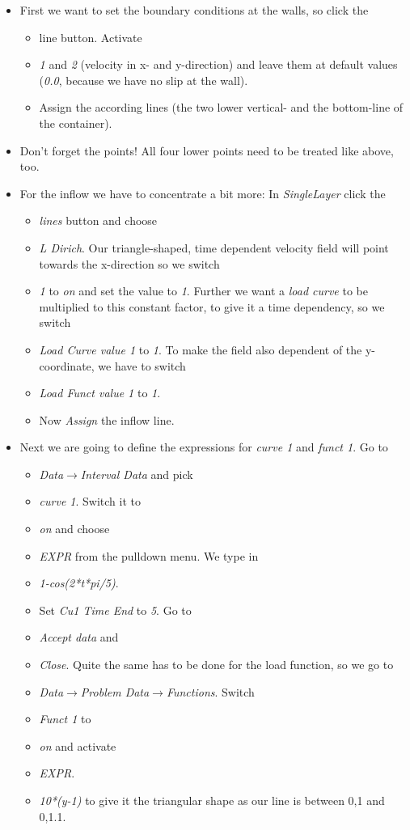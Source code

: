 \begin{itemize}
\item First we want to set the boundary conditions at the walls, so click the

\begin{itemize}
\item line button. Activate
\item \emph{1} and \emph{2} (velocity in x- and y-direction) and leave them
at default values (\emph{0.0}, because we have no slip at the wall).
\item Assign the according lines (the two lower vertical- and the bottom-line
of the container).
\end{itemize}
\item Don't forget the points! All four lower points need to be treated
like above, too.
\item For the inflow we have to concentrate a bit more: In \emph{SingleLayer}
click the

\begin{itemize}
\item \emph{lines} button and choose
\item \emph{L Dirich}. Our triangle-shaped, time dependent velocity field
will point towards the x-direction so we switch
\item \emph{1} to \emph{on} and set the value to \emph{1}. Further we want
a \emph{load curve} to be multiplied to this constant factor, to give
it a time dependency, so we switch
\item \emph{Load Curve value 1} to \emph{1}. To make the field also dependent
of the y-coordinate, we have to switch
\item \emph{Load Funct value 1} to \emph{1}.
\item Now \emph{Assign} the inflow line.
\end{itemize}
\item Next we are going to define the expressions for \emph{curve 1} and
\emph{funct 1}. Go to

\begin{itemize}
\item \emph{Data$\to$Interval Data} and pick
\item \emph{curve 1}. Switch it to
\item \emph{on} and choose
\item \emph{EXPR} from the pulldown menu. We type in
\item \emph{1-cos(2{*}t{*}pi/5)}.
\item Set \emph{Cu1 Time End} to \emph{5}. Go to
\item \emph{Accept data} and
\item \emph{Close}. Quite the same has to be done for the load function,
so we go to
\item \emph{Data$\to$Problem Data$\to$Functions}. Switch
\item \emph{Funct 1} to
\item \emph{on} and activate
\item \emph{EXPR}.
\item \emph{10{*}(y-1)} to give it the triangular shape as our line is between
0,1 and 0,1.1.
\end{itemize}
\end{itemize}

